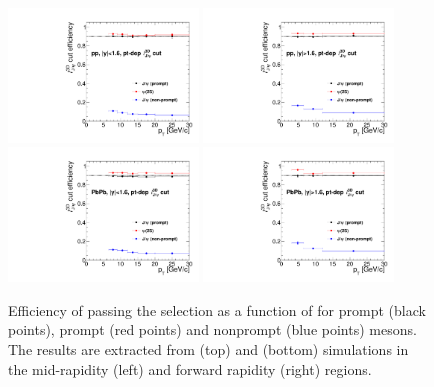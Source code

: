 \begin{figure}[htb!]
 \centering
 \includegraphics[width=0.45\textwidth]{Figures/Charmonia/Analysis/PsiPSignalExtraction/CtauCut/ctaucuteff_pp_pt_mid_ptdepcut.pdf}
 \includegraphics[width=0.45\textwidth]{Figures/Charmonia/Analysis/PsiPSignalExtraction/CtauCut/ctaucuteff_pp_pt_fwd_ptdepcut.pdf}
 \\
 \includegraphics[width=0.45\textwidth]{Figures/Charmonia/Analysis/PsiPSignalExtraction/CtauCut/ctaucuteff_pbpb_pt_mid_ptdepcut.pdf}
 \includegraphics[width=0.45\textwidth]{Figures/Charmonia/Analysis/PsiPSignalExtraction/CtauCut/ctaucuteff_pbpb_pt_fwd_ptdepcut.pdf}
 \caption{Efficiency of passing the \ctau selection as a function of \ptMuMu for prompt \JPsi (black points), prompt \PsiP (red points) and nonprompt \JPsi (blue points) mesons. The results are extracted from \Runpp (top) and \RunPbPb (bottom) simulations in the mid-rapidity (left) and forward rapidity (right) regions.}
 \label{fig:CtauCutEff}
\end{figure}


